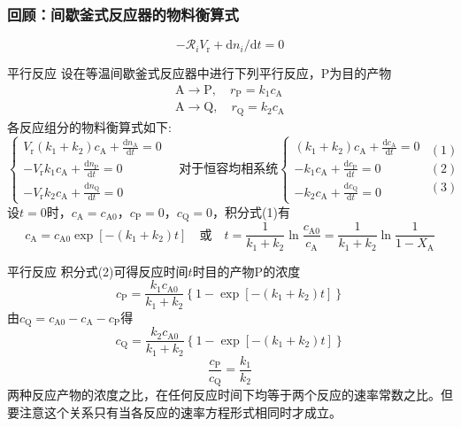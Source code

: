 \documentclass[dvipsnames, svgnames, x11names]{beamer}
\begin{document}
\begin{frame}
    \frametitle{回顾：间歇釜式反应器的物料衡算式}
    \begin{framed}
        \[
            -\mathcal{R}_iV_\mathrm{r}+\mathrm{d}n_i/\mathrm{d}t=0
        \]
    \end{framed}
\end{frame}


\begin{frame}{平行反应}
    设在等温间歇釜式反应器中进行下列平行反应，P为目的产物
    \vspace{-2pt}
    $$\begin{array}{l}
        \mathrm{A} \longrightarrow \mathrm{P}, \quad r_{\mathrm{P}}=k_{1} c_{\mathrm{A}} \\
        \mathrm{A} \longrightarrow \mathrm{Q}, \quad r_{\mathrm{Q}}=k_{2} c_{\mathrm{A}}
    \end{array}$$
    各反应组分的物料衡算式如下: 
    $$\begin{cases}
        V_{\mathrm{r}}(k_{1}+k_{2}) c_{\mathrm{A}}+\frac{\mathrm{d} n_{\mathrm{A}}}{\mathrm{d} t}=0\\
        -V_{\mathrm{r}} k_{1} c_{\mathrm{A}}+\frac{\mathrm{d} n_{\mathrm{P}}}{\mathrm{d} t}=0\\
        -V_{\mathrm{r}} k_{2} c_{\mathrm{A}}+\frac{\mathrm{d} n_{\mathrm{Q}}}{\mathrm{d} t}=0
    \end{cases}
    \quad \text{对于恒容均相系统}
    \begin{cases}
        (k_{1}+k_{2}) c_{\mathrm{A}}+\frac{\mathrm{d} c_{\mathrm{A}}}{\mathrm{d} t}=0\\
        -k_{1} c_{\mathrm{A}}+\frac{\mathrm{d} c_{\mathrm{P}}}{\mathrm{d} t}=0\\
        -k_{2} c_{\mathrm{A}}+\frac{\mathrm{d} c_{\mathrm{Q}}}{\mathrm{d} t}=0
    \end{cases}
    \begin{matrix}
        (1)\\
        (2)\\
        (3)
    \end{matrix}$$
    设$t=0$时，$c_\mathrm{A}=c_\mathrm{A0}$，$c_\mathrm{P}=0$，$c_\mathrm{Q}=0$，积分式(1)有
    $$c_{\mathrm{A}}=c_{\mathrm{A} 0} \exp [-(k_{1}+k_{2}) t] \quad \text{或}\quad t=\frac{1}{k_{1}+k_{2}} \ln \frac{c_{\mathrm{A} 0}}{c_{\mathrm{A}}} =\frac{1}{k_{1}+k_{2}} \ln \frac{1}{1-X_{\mathrm{A}}}$$
\end{frame}


\begin{frame}{平行反应}
    积分式(2)可得反应时间$t$时目的产物P的浓度
    $$c_{\mathrm{P}}=\frac{k_{1} c_{\mathrm{A} 0}}{k_{1}+k_{2}}\left\{1-\exp \left[-(k_{1}+k_{2}) t\right]\right\}$$
    由$c_{\mathrm{Q}}=c_{\mathrm{A} 0}-c_{\mathrm{A}}-c_{\mathrm{P}}$得
    $$c_{\mathrm{Q}}=\frac{k_{2} c_{\mathrm{A} 0}}{k_{1}+k_{2}}\left\{1-\exp \left[-(k_{1}+k_{2}) t\right]\right\}$$
    $$\frac{c_{\mathrm{P}}}{c_{\mathrm{Q}}}=\frac{k_{1}}{k_{2}}$$
    两种反应产物的浓度之比，在任何反应时间下均等于两个反应的速率常数之比。但要注意这个关系只有当各反应的速率方程形式相同时才成立。
\end{frame}
\end{document}
